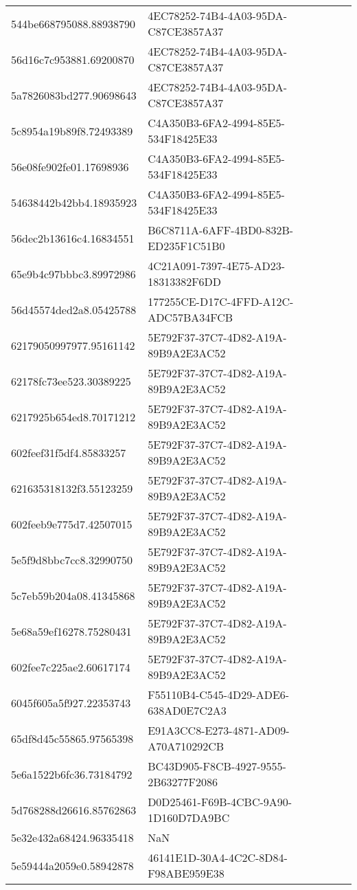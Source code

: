 \begin{tabular}{ll}
544be668795088.88938790 & 4EC78252-74B4-4A03-95DA-C87CE3857A37 \\
56d16c7c953881.69200870 & 4EC78252-74B4-4A03-95DA-C87CE3857A37 \\
5a7826083bd277.90698643 & 4EC78252-74B4-4A03-95DA-C87CE3857A37 \\
5c8954a19b89f8.72493389 & C4A350B3-6FA2-4994-85E5-534F18425E33 \\
56e08fe902fe01.17698936 & C4A350B3-6FA2-4994-85E5-534F18425E33 \\
54638442b42bb4.18935923 & C4A350B3-6FA2-4994-85E5-534F18425E33 \\
56dec2b13616c4.16834551 & B6C8711A-6AFF-4BD0-832B-ED235F1C51B0 \\
65e9b4c97bbbc3.89972986 & 4C21A091-7397-4E75-AD23-18313382F6DD \\
56d45574ded2a8.05425788 & 177255CE-D17C-4FFD-A12C-ADC57BA34FCB \\
62179050997977.95161142 & 5E792F37-37C7-4D82-A19A-89B9A2E3AC52 \\
62178fc73ee523.30389225 & 5E792F37-37C7-4D82-A19A-89B9A2E3AC52 \\
6217925b654ed8.70171212 & 5E792F37-37C7-4D82-A19A-89B9A2E3AC52 \\
602feef31f5df4.85833257 & 5E792F37-37C7-4D82-A19A-89B9A2E3AC52 \\
621635318132f3.55123259 & 5E792F37-37C7-4D82-A19A-89B9A2E3AC52 \\
602feeb9e775d7.42507015 & 5E792F37-37C7-4D82-A19A-89B9A2E3AC52 \\
5e5f9d8bbc7cc8.32990750 & 5E792F37-37C7-4D82-A19A-89B9A2E3AC52 \\
5c7eb59b204a08.41345868 & 5E792F37-37C7-4D82-A19A-89B9A2E3AC52 \\
5e68a59ef16278.75280431 & 5E792F37-37C7-4D82-A19A-89B9A2E3AC52 \\
602fee7c225ae2.60617174 & 5E792F37-37C7-4D82-A19A-89B9A2E3AC52 \\
6045f605a5f927.22353743 & F55110B4-C545-4D29-ADE6-638AD0E7C2A3 \\
65df8d45c55865.97565398 & E91A3CC8-E273-4871-AD09-A70A710292CB \\
5e6a1522b6fc36.73184792 & BC43D905-F8CB-4927-9555-2B63277F2086 \\
5d768288d26616.85762863 & D0D25461-F69B-4CBC-9A90-1D160D7DA9BC \\
5e32e432a68424.96335418 & NaN \\
5e59444a2059e0.58942878 & 46141E1D-30A4-4C2C-8D84-F98ABE959E38 \\

\end{tabular}
